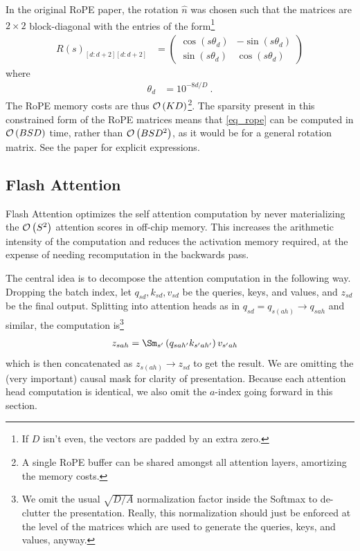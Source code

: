 In the original RoPE paper, the rotation $ \hat{n} $ was chosen such that the matrices are $ 2
	\times  2 $ block-diagonal with the entries of the form\footnote{If $ D $ isn't even, the vectors
	are padded by an extra zero.}
\begin{align}
	R(s)_{ [d:d+2][d:d+2] } & =\begin{pmatrix}
		                           \cos \left ( s \theta _{ d }   \right ) & -\sin \left ( s \theta _{ d }   \right ) \\
		                           \sin \left ( s \theta _{ d }   \right ) & \cos \left ( s \theta _{ d }   \right )
	                           \end{pmatrix}
\end{align}
where
\begin{align}
	\theta _{ d } & = 10 ^{ -8d/D   } \ .
\end{align}
The RoPE memory costs are thus $ \mathcal{O} \left( K D \right)  $\footnote{A single RoPE buffer can be
shared amongst all attention layers, amortizing the memory costs.}. The sparsity present in this constrained form of the RoPE matrices means that
\eqref{eq_rope} can be computed in $ \mathcal{O} \left( BSD \right)  $ time, rather than $ \mathcal{O} \left(
BSD ^{ 2 } \right)$, as it would be for a general rotation matrix. See the paper for explicit
expressions.


\subsection{Flash Attention \label{subsec_flash_attention}}


Flash Attention \cite{dao2022flashattention, dao2023flashattention2} optimizes the self attention
computation by never materializing the $ \mathcal{O} \left( S ^{ 2 } \right)  $ attention scores in
off-chip memory. This increases the arithmetic intensity of the computation and reduces the
activation memory required, at the expense of needing recomputation in the backwards pass.


The central idea is to decompose the attention computation in the following way. Dropping the batch
index, let $ q _{ sd }, k _{ sd }, v _{ sd } $ be the queries, keys, and values, and $ z _{ sd } $
be the final output. Splitting into attention heads as in $ q _{ sd } = q _{ s(ah) }\longrightarrow
q _{ sah } $ and similar, the computation is\footnote{We omit the usual $ \sqrt{D/A} $ normalization
factor inside the Softmax to de-clutter the presentation. Really, this normalization should just be
enforced at the level of the matrices which are used to generate the queries, keys, and values,
anyway.}
\begin{align}
    z _{ sah } &= \Sm _{ s' } \left ( q _{ sah' } k _{ s'ah' }   \right ) v _{ s'ah }
\end{align}
which is then concatenated as $ z _{ s(ah) }\longrightarrow  z _{ sd } $ to get the result. We are
omitting the (very important) causal mask for clarity of presentation.  Because each attention head
computation is identical, we also omit the $ a $-index going forward in this section.


